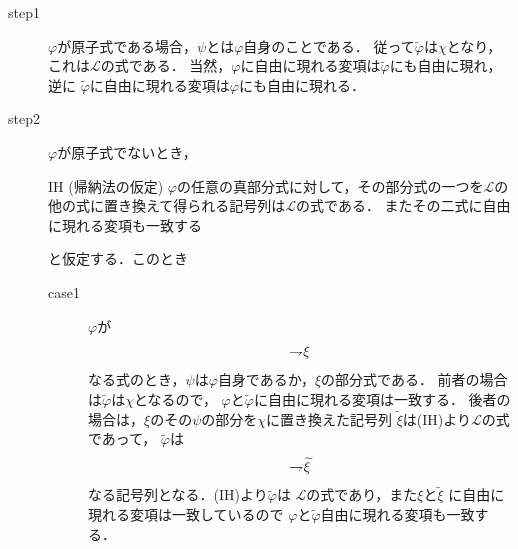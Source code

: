 	\begin{metaprf}\mbox{}
		\begin{description}
			\item[step1] $\varphi$が原子式である場合，$\psi$とは$\varphi$自身のことである．
				従って$\widetilde{\varphi}$は$\chi$となり，これは$\mathcal{L}$の式である．
				当然，$\varphi$に自由に現れる変項は$\widetilde{\varphi}$にも自由に現れ，逆に
				$\widetilde{\varphi}$に自由に現れる変項は$\varphi$にも自由に現れる．
							
			\item[step2] $\varphi$が原子式でないとき，
				\begin{itembox}[l]{IH (帰納法の仮定)}
					$\varphi$の任意の真部分式に対して，その部分式の一つを$\mathcal{L}$の
					他の式に置き換えて得られる記号列は$\mathcal{L}$の式である．
					またその二式に自由に現れる変項も一致する
				\end{itembox}
				と仮定する．このとき
				\begin{description}
					\item[case1] $\varphi$が
						\begin{align}
							\rightharpoondown\hspace{-0.25em} \xi
						\end{align}
						なる式のとき，$\psi$は$\varphi$自身であるか，$\xi$の部分式である．
						前者の場合は$\widetilde{\varphi}$は$\chi$となるので，
						$\varphi$と$\widetilde{\varphi}$に自由に現れる変項は一致する．
						後者の場合は，$\xi$のその$\psi$の部分を$\chi$に置き換えた記号列
						$\widetilde{\xi}$は(IH)より$\mathcal{L}$の式であって，
						$\widetilde{\varphi}$は
						\begin{align}
							\rightharpoondown\hspace{-0.25em} \widetilde{\xi}
						\end{align}
						なる記号列となる．(IH)より$\widetilde{\varphi}$は
						$\mathcal{L}$の式であり，また$\xi$と$\widetilde{\xi}$
						に自由に現れる変項は一致しているので
						$\varphi$と$\widetilde{\varphi}$自由に現れる変項も一致する．
					

\end{description}
\end{description}
\end{metaprf}
